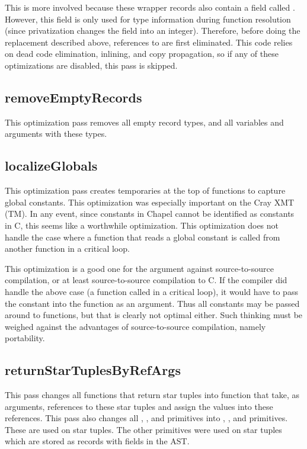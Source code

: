 \documentclass[10pt]{article}
\begin{document}
This is more involved because these wrapper records also contain a
field called .  However, this field is only used for
type information during function resolution (since privatization
changes the  field into an integer).  Therefore, before
doing the replacement described above, references to 
are first eliminated.  This code relies on dead code elimination,
inlining, and copy propagation, so if any of these optimizations are
disabled, this pass is skipped.

\subsection{removeEmptyRecords}

This optimization pass removes all empty record types, and all
variables and arguments with these types.

\subsection{localizeGlobals}
\label{sec:pruneagain}

This optimization pass creates temporaries at the top of functions to
capture global constants.  This optimization was especially important
on the Cray XMT (TM).  In any event, since constants in Chapel cannot
be identified as constants in C, this seems like a worthwhile
optimization.  This optimization does not handle the case where a
function that reads a global constant is called from another function
in a critical loop.

This optimization is a good one for the argument against
source-to-source compilation, or at least source-to-source compilation
to C.  If the compiler did handle the above case (a function called in
a critical loop), it would have to pass the constant into the function
as an argument.  Thus all constants may be passed around to functions,
but that is clearly not optimal either.  Such thinking must be weighed
against the advantages of source-to-source compilation, namely
portability.

\subsection{returnStarTuplesByRefArgs}

This pass changes all functions that return star tuples into function
that take, as arguments, references to these star tuples and assign
the values into these references.  This pass also changes all
, , and  primitives
into , , and
 primitives.  These are used on star
tuples.  The other primitives were used on star tuples which are
stored as records with fields in the AST.
\end{document}
